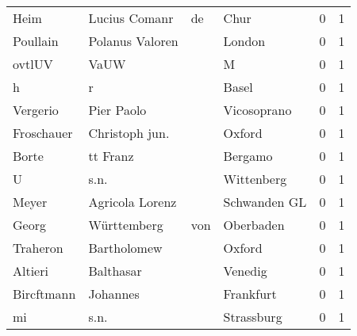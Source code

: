 \begin{center}
\begin{tiny}
\begin{longtabu}{llllrr}
                     Heim &                      Lucius Comanr &          de &                                        Chur &          0 &         1 \\
                 Poullain &                    Polanus Valoren &             &                                      London &          0 &         1 \\
                   ovtlUV &                               VaUW &             &                                           M &          0 &         1 \\
                        h &                                  r &             &                                       Basel &          0 &         1 \\
                 Vergerio &                         Pier Paolo &             &                                 Vicosoprano &          0 &         1 \\
               Froschauer &                     Christoph jun. &             &                                      Oxford &          0 &         1 \\
                    Borte &                           tt Franz &             &                                     Bergamo &          0 &         1 \\
                        U &                               s.n. &             &                                  Wittenberg &          0 &         1 \\
                    Meyer &                    Agricola Lorenz &             &                                Schwanden GL &          0 &         1 \\
                    Georg &                        Württemberg &         von &                                   Oberbaden &          0 &         1 \\
                 Traheron &                        Bartholomew &             &                                      Oxford &          0 &         1 \\
                  Altieri &                          Balthasar &             &                                     Venedig &          0 &         1 \\
               Bircftmann &                           Johannes &             &                                   Frankfurt &          0 &         1 \\
                       mi &                               s.n. &             &                                  Strassburg &          0 &         1 \\

\end{longtabu}
\end{tiny}
\end{center}
